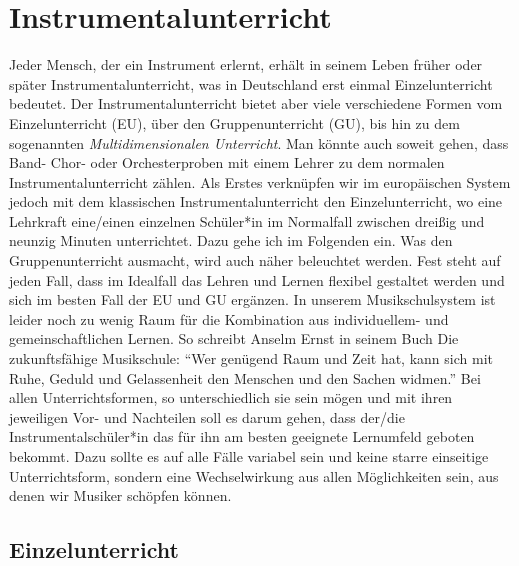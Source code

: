 \section{Instrumentalunterricht}

Jeder Mensch, der ein Instrument erlernt, erhält in seinem Leben früher oder
später Instrumentalunterricht, was in Deutschland erst einmal Einzelunterricht
bedeutet. Der Instrumentalunterricht bietet aber viele verschiedene Formen vom
Einzelunterricht (EU), über den Gruppenunterricht (GU), bis hin zu dem
sogenannten \emph{Multidimensionalen Unterricht}. Man könnte auch soweit gehen,
dass Band- Chor- oder Orchesterproben mit einem Lehrer zu dem normalen
Instrumentalunterricht zählen. Als Erstes verknüpfen wir im europäischen System
jedoch mit dem klassischen Instrumentalunterricht den Einzelunterricht, wo eine
Lehrkraft eine/einen einzelnen Schüler*in im Normalfall zwischen dreißig und neunzig
Minuten unterrichtet. Dazu gehe ich im Folgenden ein. Was den Gruppenunterricht
ausmacht, wird auch näher beleuchtet werden. Fest steht auf jeden Fall, dass im
Idealfall das Lehren und Lernen flexibel gestaltet werden und sich im besten
Fall der EU und GU ergänzen. In unserem Musikschulsystem ist leider noch zu
wenig Raum für die Kombination aus individuellem- und gemeinschaftlichen Lernen.
So schreibt Anselm Ernst in seinem Buch Die zukunftsfähige Musikschule:
\enquote{Wer genügend Raum und Zeit hat, kann sich mit Ruhe, Geduld und
Gelassenheit den Menschen und den Sachen widmen.}
\autocite[84]{ernst:die_zukunftsfaehige_musikschule} Bei allen
Unterrichtsformen, so unterschiedlich sie sein mögen und mit ihren jeweiligen
Vor- und Nachteilen soll es darum gehen, dass der/die Instrumentalschüler*in das
für ihn am besten geeignete Lernumfeld geboten bekommt. Dazu sollte es auf alle
Fälle variabel sein und keine starre einseitige Unterrichtsform, sondern eine
Wechselwirkung aus allen Möglichkeiten sein, aus denen wir Musiker schöpfen
können. 


\subsection{Einzelunterricht}

